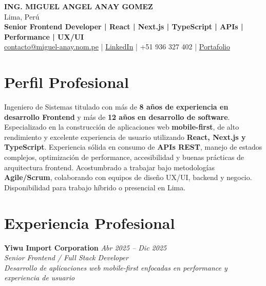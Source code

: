 \documentclass[11pt,a4paper]{article}
\begin{document}
\begin{center}
{\Large \textbf{ING. MIGUEL ANGEL ANAY GOMEZ}}\\
Lima, Perú\\
\textbf{Senior Frontend Developer | React | Next.js | TypeScript | APIs | Performance | UX/UI}\\
\href{mailto:contacto@miguel-anay.nom.pe}{contacto@miguel-anay.nom.pe} \;|\;
\href{https://www.linkedin.com/in/miguel-anay/}{LinkedIn} \;|\;
+51 936 327 402 \;|\;
\href{https://portfolio.miguel-anay.nom.pe}{Portafolio}
\end{center}

\vspace{0.3cm}

\section*{Perfil Profesional}

Ingeniero de Sistemas titulado con más de \textbf{8 años de experiencia en desarrollo Frontend} y más de \textbf{12 años en desarrollo de software}.  
Especializado en la construcción de aplicaciones web \textbf{mobile-first}, de alto rendimiento y excelente experiencia de usuario utilizando \textbf{React, Next.js y TypeScript}.  
Experiencia sólida en consumo de \textbf{APIs REST}, manejo de estados complejos, optimización de performance, accesibilidad y buenas prácticas de arquitectura frontend.  
Acostumbrado a trabajar bajo metodologías \textbf{Agile/Scrum}, colaborando con equipos de diseño UX/UI, backend y negocio.  
Disponibilidad para trabajo híbrido o presencial en Lima.

\section*{Experiencia Profesional}

\textbf{Yiwu Import Corporation} \hfill \textit{Abr 2025 – Dic 2025}\\
\textit{Senior Frontend / Full Stack Developer}\\
\textit{Desarrollo de aplicaciones web mobile-first enfocadas en performance y experiencia de usuario}
\end{document}
